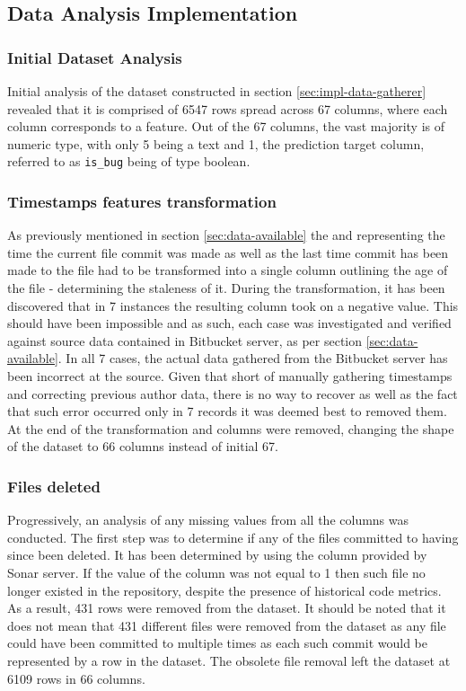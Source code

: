 \subsection{Data Analysis Implementation}\label{sec:impl-data-analysis}
\subsubsection{Initial Dataset Analysis}
Initial analysis of the dataset constructed in section \ref{sec:impl-data-gatherer} revealed that it is comprised of 6547 rows spread across 67 columns, where each column corresponds to a feature. Out of the 67 columns, the vast majority is of numeric type, with only 5 being a text and 1, the prediction target column, referred to as \texttt{is\_bug} being of type boolean.

\subsubsection{Timestamps features transformation}\label{sec:impl-data-analysis:make-file-age}
As previously mentioned in section \ref{sec:data-available} the \timestamp{} and \prevTimestamp{} representing the time the current file commit was made as well as the last time commit has been made to the file had to be transformed into a single column outlining the age of the file - determining the staleness of it.
During the transformation, it has been discovered that in 7 instances the resulting column took on a negative value. This should have been impossible and as such, each case was investigated and verified against source data contained in Bitbucket server, as per section \ref{sec:data-available}. In all 7 cases, the actual data gathered from the Bitbucket server has been incorrect at the source. Given that short of manually gathering timestamps and correcting previous author data, there is no way to recover as well as the fact that such error occurred only in 7 records it was deemed best to removed them.
At the end of the transformation \timestamp{} and \prevTimestamp{} columns were removed, changing the shape of the dataset to 66 columns instead of initial 67.

\subsubsection{Files deleted}\label{sec:impl-data-analysis:files-deleted}
Progressively, an analysis of any missing values from all the columns was conducted. The first step was to determine if any of the files committed to having since been deleted. It has been determined by using the \files{} column provided by Sonar server. If the value of the column was not equal to 1 then such file no longer existed in the repository, despite the presence of historical code metrics. As a result, 431 rows were removed from the dataset. It should be noted that it does not mean that 431 different files were removed from the dataset as any file could have been committed to multiple times as each such commit would be represented by a row in the dataset. The obsolete file removal left the dataset at 6109 rows in 66 columns.

